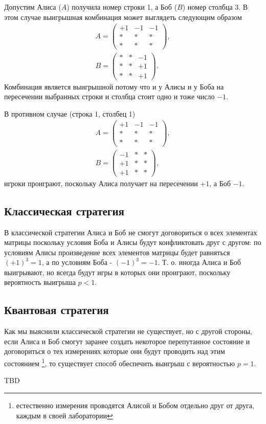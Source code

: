 \begin{example}
Допустим Алиса ($A$) получила номер строки 1, а Боб ($B$) номер
столбца 3. В этом случае выигрышная комбинация может выглядеть
следующим образом  
\begin{eqnarray}
A = \left(
\begin{array}{ccc}
+1 & -1 & -1 \\
\ast & \ast & \ast \\
\ast & \ast & \ast  
\end{array}
\right),
\nonumber \\
B = \left(
\begin{array}{ccc}
\ast & \ast & -1 \\
\ast & \ast & +1 \\
\ast & \ast & +1  
\end{array}
\right).
\nonumber 
\end{eqnarray}
Комбинация является выигрышной потому что и у Алисы и у Боба на
пересечении выбранных строки и столбца стоит одно и тоже число $-1$. 


В противном случае (строка 1, столбец 1) 
\begin{eqnarray}
A = \left(
\begin{array}{ccc}
+1 & -1 & -1 \\
\ast & \ast & \ast \\
\ast & \ast & \ast  
\end{array}
\right),
\nonumber \\
B = \left(
\begin{array}{ccc}
-1 & \ast & \ast \\
+1 & \ast & \ast \\
+1 & \ast & \ast  
\end{array}
\right),
\nonumber 
\end{eqnarray}
игроки проиграют, поскольку Алиса получает на пересечении $+1$, а Боб
$-1$. 
\end{example}


\subsection{Классическая стратегия}
В классической стратегии Алиса и Боб не смогут договориться о всех
элементах матрицы поскольку условия Боба и Алисы будут конфликтовать
друг с другом: по условиям Алисы произведение всех элементов матрицы
будет равняться $(+1)^3 = 1$, а по условиям Боба - $(-1)^3 = -1$.
Т. о. иногда Алиса и Боб выигрывают, но всегда будут игры в которых
они проиграют, поскольку вероятность выигрыша $p < 1$.

\subsection{Квантовая стратегия}
Как мы выяснили классической стратегии не существует, но с другой
стороны, если Алиса и Боб смогут заранее создать некоторое
перепутанное состояние и договориться о тех измерениях которые они
будут проводить над этим состоянием
\footnote{
естественно измерения проводятся Алисой и Бобом отдельно друг от
друга, каждым в своей лаборатории 
}, то существует способ обеспечить выигрыш с вероятностью $p = 1$.

TBD

